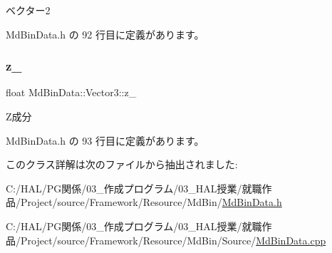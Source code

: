 ベクター2 



 Md\+Bin\+Data.\+h の 92 行目に定義があります。

\mbox{\label{class_md_bin_data_1_1_vector3_a5bf432978dbd9411afe66e69fd8aaaef}} 
\subsubsection{\texorpdfstring{z\+\_\+}{z\_}}
{\footnotesize\ttfamily float Md\+Bin\+Data\+::\+Vector3\+::z\+\_\+\hspace{0.3cm}{\ttfamily [private]}}



Z成分 



 Md\+Bin\+Data.\+h の 93 行目に定義があります。



このクラス詳解は次のファイルから抽出されました\+:\begin{DoxyCompactItemize}
\item 
C\+:/\+H\+A\+L/\+P\+G関係/03\+\_\+作成プログラム/03\+\_\+\+H\+A\+L授業/就職作品/\+Project/source/\+Framework/\+Resource/\+Md\+Bin/\mbox{\hyperlink{_md_bin_data_8h}{Md\+Bin\+Data.\+h}}\item 
C\+:/\+H\+A\+L/\+P\+G関係/03\+\_\+作成プログラム/03\+\_\+\+H\+A\+L授業/就職作品/\+Project/source/\+Framework/\+Resource/\+Md\+Bin/\+Source/\mbox{\hyperlink{_md_bin_data_8cpp}{Md\+Bin\+Data.\+cpp}}\end{DoxyCompactItemize}
